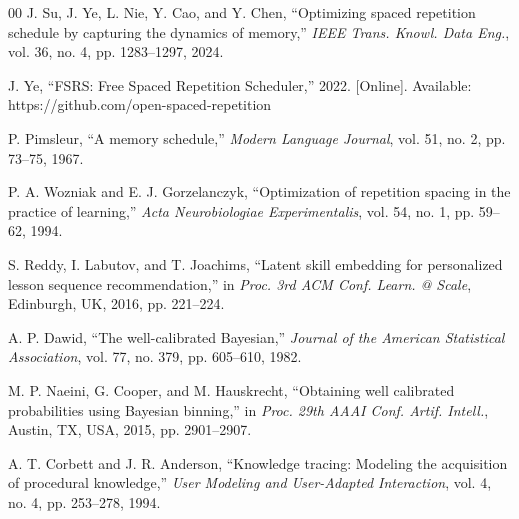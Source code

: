 \documentclass[conference]{IEEEtran}
\begin{document}
\begin{thebibliography}{00}
 J. Su, J. Ye, L. Nie, Y. Cao, and Y. Chen, ``Optimizing spaced repetition schedule by capturing the dynamics of memory,'' \textit{IEEE Trans. Knowl. Data Eng.}, vol. 36, no. 4, pp. 1283--1297, 2024.

 J. Ye, ``FSRS: Free Spaced Repetition Scheduler,'' 2022. [Online]. Available: https://github.com/open-spaced-repetition

 P. Pimsleur, ``A memory schedule,'' \textit{Modern Language Journal}, vol. 51, no. 2, pp. 73--75, 1967.

 P. A. Wozniak and E. J. Gorzelanczyk, ``Optimization of repetition spacing in the practice of learning,'' \textit{Acta Neurobiologiae Experimentalis}, vol. 54, no. 1, pp. 59--62, 1994.

 S. Reddy, I. Labutov, and T. Joachims, ``Latent skill embedding for personalized lesson sequence recommendation,'' in \textit{Proc. 3rd ACM Conf. Learn. @ Scale}, Edinburgh, UK, 2016, pp. 221--224.

 A. P. Dawid, ``The well-calibrated Bayesian,'' \textit{Journal of the American Statistical Association}, vol. 77, no. 379, pp. 605--610, 1982.

 M. P. Naeini, G. Cooper, and M. Hauskrecht, ``Obtaining well calibrated probabilities using Bayesian binning,'' in \textit{Proc. 29th AAAI Conf. Artif. Intell.}, Austin, TX, USA, 2015, pp. 2901--2907.

 A. T. Corbett and J. R. Anderson, ``Knowledge tracing: Modeling the acquisition of procedural knowledge,'' \textit{User Modeling and User-Adapted Interaction}, vol. 4, no. 4, pp. 253--278, 1994.

\end{thebibliography}
\end{document}
